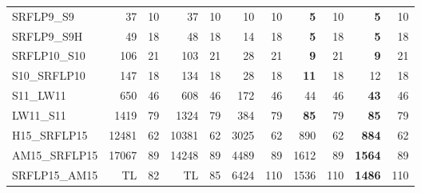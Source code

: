\documentclass{article}
\begin{document}
\begin{longtable}{lrrrrrrrrrr}
SRFLP9\_S9 & 37 & 10 & 37 & 10 & 10 & 10 & \textbf{5} & 10 & \textbf{5} & 10 \\
SRFLP9\_S9H & 49 & 18 & 48 & 18 & 14 & 18 & \textbf{5} & 18 & \textbf{5} & 18 \\
SRFLP10\_S10 & 106 & 21 & 103 & 21 & 28 & 21 & \textbf{9} & 21 & \textbf{9} & 21 \\
S10\_SRFLP10 & 147 & 18 & 134 & 18 & 28 & 18 & \textbf{11} & 18 & 12 & 18 \\
S11\_LW11 & 650 & 46 & 608 & 46 & 172 & 46 & 44 & 46 & \textbf{43} & 46 \\
LW11\_S11 & 1419 & 79 & 1324 & 79 & 384 & 79 & \textbf{85} & 79 & \textbf{85} & 79 \\
H15\_SRFLP15 & 12481 & 62 & 10381 & 62 & 3025 & 62 & 890 & 62 & \textbf{884} & 62 \\
AM15\_SRFLP15 & 17067 & 89 & 14248 & 89 & 4489 & 89 & 1612 & 89 & \textbf{1564} & 89 \\
SRFLP15\_AM15 & TL & 82 & TL & 85 & 6424 & 110 & 1536 & 110 & \textbf{1486} & 110 
\end{longtable}
\endgroup{}
\end{document}
